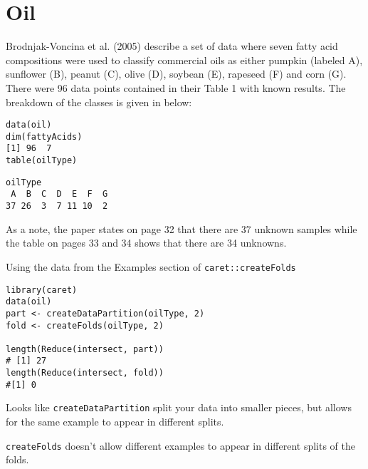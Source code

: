 \documentclass[caret-main.tex]{subfiles}
\begin{document}
\section{Oil}

Brodnjak-Voncina et al. (2005) describe a set of data where seven fatty acid compositions were used to classify commercial oils as either pumpkin (labeled A), sunflower (B), peanut (C), olive (D), soybean (E), rapeseed (F) and corn (G). There were 96 data points contained in their Table 1 with known results. The breakdown of the classes is given in below:

\begin{framed}
\begin{verbatim}
data(oil)
dim(fattyAcids)
[1] 96  7
table(oilType)
\end{verbatim}
\end{framed}
\begin{verbatim}
oilType
 A  B  C  D  E  F  G 
37 26  3  7 11 10  2 
\end{verbatim}
As a note, the paper states on page 32 that there are 37 unknown samples while the table on pages 33 and 34 shows that there are 34 unknowns.


Using the data from the Examples section of \texttt{caret::createFolds}

\begin{framed}
\begin{verbatim}
library(caret) 
data(oil) 
part <- createDataPartition(oilType, 2) 
fold <- createFolds(oilType, 2) 

length(Reduce(intersect, part)) 
# [1] 27 
length(Reduce(intersect, fold)) 
#[1] 0 

\end{verbatim}
\end{framed}




\newpage
Looks like \texttt{createDataPartition} split your data into smaller pieces, 
but allows for the same example to appear in different splits. 

\texttt{createFolds} doesn't allow different examples to appear in different 
splits of the folds. 

\end{document}
